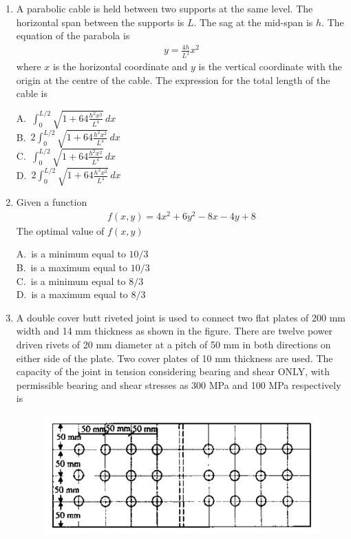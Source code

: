 \documentclass[journal,12pt,onecolumn]{IEEEtran}
\theoremstyle{remark}
\begin{document}
\begin{enumerate}
\noindent\item A parabolic cable is held between two supports at the same level. The horizontal span between the supports is $L$. The sag at the mid-span is $h$. The equation of the parabola is 
\begin{align*}
y = \frac{4h}{L^2} x^2
\end{align*}
where $x$ is the horizontal coordinate and $y$ is the vertical coordinate with the origin at the centre of the cable. The expression for the total length of the cable is
\hfill{}

A.\ $\int_0^{L/2} \sqrt{1 + 64 \frac{h^2 x^2}{L^4}} \, dx$ \\
B.\ $2 \int_0^{L/2} \sqrt{1 + 64 \frac{h^2 x^2}{L^4}} \, dx$ \\
C.\ $\int_0^{L/2} \sqrt{1 + 64 \frac{h^2 x^2}{L^4}} \, dx$ \\
D.\ $2 \int_0^{L/2} \sqrt{1 + 64 \frac{h^2 x^2}{L^4}} \, dx$

\noindent\item Given a function 
\begin{align*}
f(x, y) = 4x^2 + 6y^2 - 8x - 4y + 8
\end{align*}
The optimal value of $f(x, y)$
\hfill{}
\begin{multicols}{4}
A.\ is a minimum equal to $10/3$ \\
B.\ is a maximum equal to $10/3$ \\
C.\ is a minimum equal to $8/3$ \\
D.\ is a maximum equal to $8/3$
\end{multicols}

\noindent\item A double cover butt riveted joint is used to connect two flat plates of 200 mm width and 14 mm thickness as shown in the figure. There are twelve power driven rivets of 20 mm diameter at a pitch of 50 mm in both directions on either side of the plate. Two cover plates of 10 mm thickness are used. The capacity of the joint in tension considering bearing and shear ONLY, with permissible bearing and shear stresses as 300 MPa and 100 MPa respectively is
\hfill{}

\begin{figure}[H]
     \centering
     \includegraphics[scale=0.5]{figs/8332fb3c-532c-4d6c-a8c4-1f20c3321f4f.jpg} 
     \caption{}
     \label{fig:figure3}
 \end{figure}


\end{enumerate}
\end{document}
